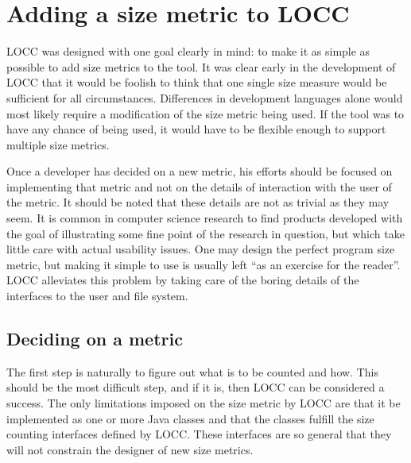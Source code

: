 
\chapter{Adding a size metric to LOCC}
\label{chap:add}

LOCC was designed with one goal clearly in mind: to make it as simple
as possible to add size metrics to the tool.  It was clear early in
the development of LOCC that it would be foolish to think that one single
size measure would be sufficient for all circumstances.  Differences
in development languages alone would most likely require a
modification of the size metric being used.  If the tool was to have
any chance of being used, it would have to be flexible enough to
support multiple size metrics.

Once a developer has decided on a new metric, his efforts should be
focused on implementing that metric and not on the details of
interaction with the user of the metric.  It should be noted that
these details are not as trivial as they may seem.  It is common in
computer science research to find products developed with the goal of
illustrating some fine point of the research in question, but which take
little care with actual usability issues.  One may design the perfect
program size metric, but making it simple to use is usually left ``as
an exercise for the reader''.  LOCC alleviates this problem by taking 
care of the boring details of the interfaces to the user
and file system.

\section{Deciding on a metric}

The first step is naturally to figure out what is to be counted and how.
This should be the most difficult step, and if it is, then LOCC can be
considered a success.  The only limitations imposed on the size metric by
LOCC are that it be implemented as one or more Java classes and that the
classes fulfill the size counting interfaces defined by LOCC.  These
interfaces are so general that they will not constrain the designer of new
size metrics.

